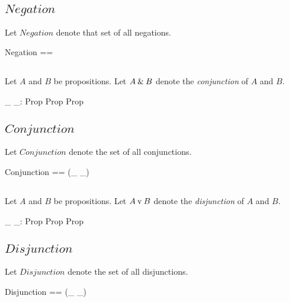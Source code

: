 \documentclass[11pt, oneside]{article}
\begin{document}
\subsection{$Negation$}

Let $Negation$ denote that set of all negations.

\begin{zed}
	Negation == \ran \notProp
\end{zed}

\subsection{}

Let $A$ and $B$ be propositions.
Let $A \mathbin{\&} B$ denote the {\it conjunction} of $A$ and $B$.

\begin{axdef}
	\_ \andProp \_: Prop \cross Prop \inj Prop
\end{axdef}

\subsection{$Conjunction$}

Let $Conjunction$ denote the set of all conjunctions.

\begin{zed}
	Conjunction == \ran (\_ \andProp \_)
\end{zed}

\subsection{}

Let $A$ and $B$ be propositions.
Let $A \mathbin{\mathrm{v}} B$ denote the {\it disjunction} of $A$ and $B$.

\begin{axdef}
	\_ \orProp \_: Prop \cross Prop \inj Prop
\end{axdef}

\subsection{$Disjunction$}

Let $Disjunction$ denote the set of all disjunctions.

\begin{zed}
	Disjunction == \ran (\_ \orProp \_)
\end{zed}
\end{document}
